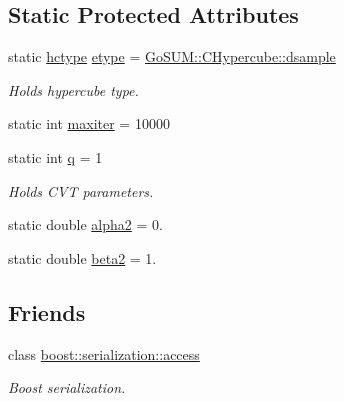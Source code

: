 \subsection*{Static Protected Attributes}
\begin{DoxyCompactItemize}
\item 
static \hyperlink{class_go_s_u_m_1_1_c_hypercube_a9113655515864c06ea6d4f08d5195c90}{hctype} \hyperlink{class_go_s_u_m_1_1_c_hypercube_a8f9d864e2940c4982480ea394931fcf5}{etype} = \hyperlink{class_go_s_u_m_1_1_c_hypercube_a9113655515864c06ea6d4f08d5195c90abe62aed07dcbdbeda5783e3345005e16}{Go\-S\-U\-M\-::\-C\-Hypercube\-::dsample}
\begin{DoxyCompactList}\small\item\em Holds hypercube type. \end{DoxyCompactList}\item 
static int \hyperlink{class_go_s_u_m_1_1_c_hypercube_a0e3ec089584a2c55fbc8db58b1e543ac}{maxiter} = 10000
\item 
static int \hyperlink{class_go_s_u_m_1_1_c_hypercube_aecbeeb5c680a49beeebbc613242055d4}{q} = 1
\begin{DoxyCompactList}\small\item\em Holds C\-V\-T parameters. \end{DoxyCompactList}\item 
static double \hyperlink{class_go_s_u_m_1_1_c_hypercube_a88f945378fe038456780cdc88aeaadd0}{alpha2} = 0.
\item 
static double \hyperlink{class_go_s_u_m_1_1_c_hypercube_a674776d76c1fd0d53a25975b057198f9}{beta2} = 1.
\end{DoxyCompactItemize}
\subsection*{Friends}
\begin{DoxyCompactItemize}
\item 
class \hyperlink{class_go_s_u_m_1_1_c_hypercube_ac98d07dd8f7b70e16ccb9a01abf56b9c}{boost\-::serialization\-::access}
\begin{DoxyCompactList}\small\item\em Boost serialization. \end{DoxyCompactList}\end{DoxyCompactItemize}


